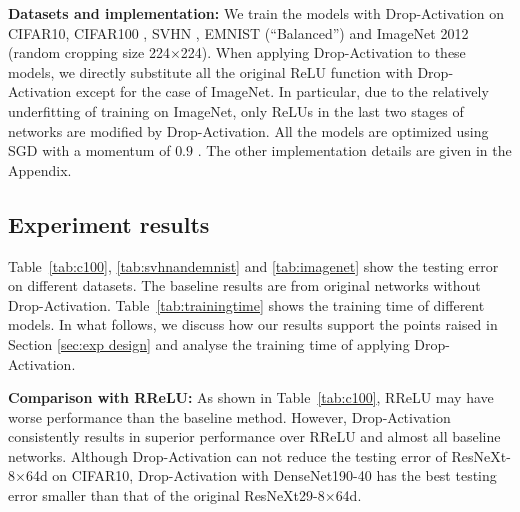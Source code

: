 \documentclass[11pt]{article}
\begin{document}
\noindent\textbf{Datasets and implementation:} We train the models with Drop-Activation on CIFAR10, CIFAR100 \cite{cifar}, SVHN \cite{svhn}, EMNIST (``Balanced'') \cite{emnist} and ImageNet 2012 \cite{ImageNet} (random cropping size 224$\times$224). When applying Drop-Activation to these models, we directly substitute all the original ReLU function with Drop-Activation except for the case of ImageNet. In particular, due to the relatively underfitting of training on ImageNet, only ReLUs in the last two stages of networks are modified by Drop-Activation. All the models are optimized using SGD with a momentum of $0.9$ \cite{Sutskever:2013}. The other implementation details are given in the Appendix.

\subsection{Experiment results}
\label{subsec:result}
Table~\ref{tab:c100}, \ref{tab:svhnandemnist} and \ref{tab:imagenet} show the testing error on different datasets. The baseline results are from original networks without Drop-Activation. Table~\ref{tab:trainingtime} shows the training time of different models. In what follows, we discuss how our results support the points raised in Section \ref{sec:exp design} and analyse the training time of applying Drop-Activation.

\textbf{Comparison with RReLU: } As shown in Table~\ref{tab:c100}, RReLU may have worse performance than the baseline method. However, Drop-Activation consistently results in superior performance over RReLU and almost all baseline networks. Although Drop-Activation can not reduce the testing error of ResNeXt-8$\times$64d on CIFAR10, Drop-Activation with DenseNet190-40 has the best testing error smaller than that of the original ResNeXt29-8$\times$64d.
\end{document}
